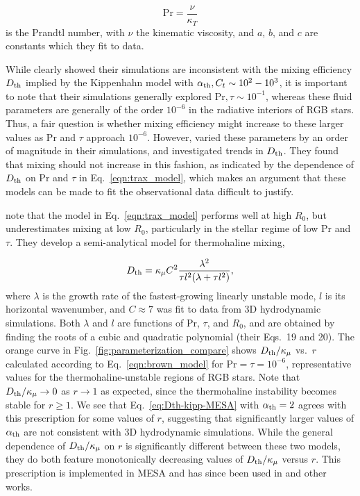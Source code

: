 \begin{equation} \label{eq:Prandtl}
    \mathrm{Pr} = \frac{\nu}{\kappa_T}
\end{equation}
is the Prandtl number, with $\nu$ the kinematic viscosity,
%
and $a$, $b$, and $c$ are constants which they fit to data. 

While \citet{traxler_etal_2011} clearly showed their simulations are inconsistent with the mixing efficiency $D_\mathrm{th}$ implied by the Kippenhahn model with $\alpha_{\rm{th}}, C_t \sim 10^2-10^3$, it is important to note that their simulations generally explored $\mathrm{Pr}, \tau \sim 10^{-1}$, whereas these fluid parameters are generally of the order $10^{-6}$ in the radiative interiors of RGB stars. 
Thus, a fair question is whether mixing efficiency might increase to these larger values as $\mathrm{Pr}$ and $\tau$ approach $10^{-6}$. 
However, \citet{traxler_etal_2011} varied these parameters by an order of magnitude in their simulations, and investigated trends in $D_\mathrm{th}$. They found that mixing should not increase in this fashion, as indicated by the dependence of $D_\mathrm{th}$ on $\mathrm{Pr}$ and $\tau$ in Eq.~\eqref{eqn:trax_model}, which makes an argument that these models can be made to fit the observational data difficult to justify. 

\citet{brown_etal_2013} note that the model in Eq.~\eqref{eqn:trax_model} performs well at high $R_0$, but underestimates mixing at low $R_0$, particularly in the stellar regime of low Pr and $\tau$.
They develop a semi-analytical model for thermohaline mixing,

\begin{equation}
    \Dth = \kappa_{\mu}C^2\frac{\lambda^2}{\tau l^2(\lambda + \tau l^2)},
    \label{eqn:brown_model}
\end{equation}
where $\lambda$ is the growth rate of the fastest-growing linearly unstable mode, $l$ is its horizontal wavenumber, and $C \approx 7$ was fit to data from 3D hydrodynamic simulations.
Both $\lambda$ and $l$ are functions of $\mathrm{Pr}$, $\tau$, and $R_0$, and are obtained by finding the roots of a cubic and quadratic polynomial (their Eqs.~19 and 20).
The orange curve in Fig.~\ref{fig:parameterization_compare} shows $D_\mathrm{th}/\kappa_\mu$ vs.~$r$ calculated according to Eq.~\eqref{eqn:brown_model} for $\mathrm{Pr} = \tau = 10^{-6}$, representative values for the thermohaline-unstable regions of RGB stars. 
Note that $D_\mathrm{th}/\kappa_\mu \to 0$ as $r \to 1$ as expected, since the thermohaline instability becomes stable for $r \geq 1$.
We see that Eq.~\eqref{eq:Dth-kipp-MESA} with $\alpha_{\rm{th}} = 2$ agrees with this prescription for some values of $r$, suggesting that significantly larger values of $\alpha_{\rm{th}}$ are not consistent with 3D hydrodynamic simulations. 
While the general dependence of $D_\mathrm{th}/\kappa_\mu$ on $r$ is significantly different between these two models, they do both feature monotonically decreasing values of $D_\mathrm{th}/\kappa_\mu$ versus $r$. 
This prescription is implemented in MESA and has since been used in \citet{bauer_bildsten_2019} and other works. 

